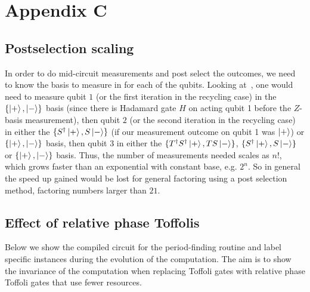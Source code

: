 \chapter{Appendix C}

\section{Postselection scaling}

In order to do mid-circuit measurements and post select the outcomes, we need to know the basis to measure in for each of the qubits. Looking at~, one would need to measure qubit $1$ (or the first iteration in the recycling case) in the $\{ \ket{+},\ket{-}\}$ basis (since there is Hadamard gate $H$ on acting qubit 1 before the $Z$-basis measurement), then qubit $2$ (or the second iteration in the recycling case) in either the $\{ S^{\dagger}\ket{+},S\ket{-}\}$ (if our measurement outcome on qubit 1 was $\ket{+}$) or $\{ \ket{+},\ket{-}\}$ basis, then qubit $3$ in either the $\{ T^{\dagger}S^{\dagger}\ket{+},TS\ket{-}\}$, $\{ S^{\dagger}\ket{+},S\ket{-}\}$ or $\{ \ket{+},\ket{-}\}$ basis. Thus, the number of measurements needed scales as $n!$, which grows faster than an exponential with constant base, e.g. $2^n$. So in general the speed up gained would be lost for general factoring using a post selection method, \ie factoring numbers larger than $21$.


\section{Effect of relative phase Toffolis}

Below we show the compiled circuit for the period-finding routine and label specific instances during the evolution of the computation. The aim is to show the invariance of the computation when replacing Toffoli gates with relative phase Toffoli gates that use fewer resources.  

